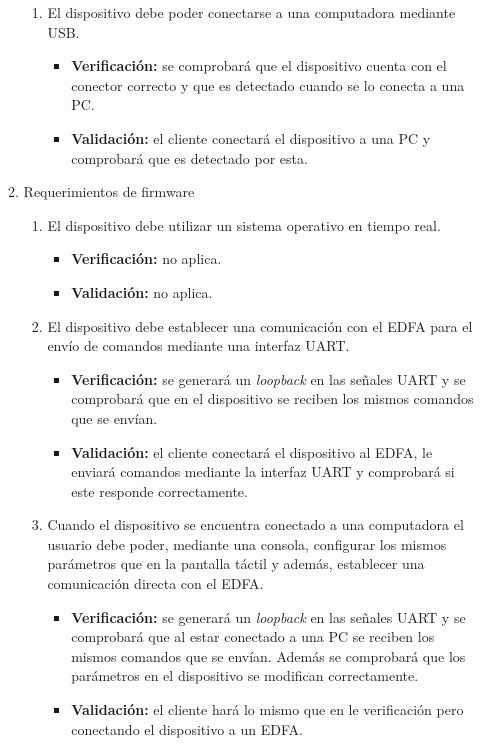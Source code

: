 \documentclass[
11pt, %
]{charter}
\begin{document}
\begin{enumerate}
\begin{enumerate}
\begin{enumerate}[label*=\arabic*.]
\item El dispositivo debe poder conectarse a una computadora mediante USB.
\begin{itemize}
	\item \textbf{Verificación:} se comprobará que el dispositivo cuenta con el conector correcto y que es detectado cuando se lo conecta a una PC.
	\item \textbf{Validación:} el cliente conectará el dispositivo a una PC y comprobará que es detectado por esta.
\end{itemize}

\end{enumerate}

\item Requerimientos de firmware
\begin{enumerate}[label*=\arabic*.]
\item El dispositivo debe utilizar un sistema operativo en tiempo real.
\begin{itemize}
	\item \textbf{Verificación:} no aplica.
	\item \textbf{Validación:} no aplica.
\end{itemize}

\item El dispositivo debe establecer una comunicación con el EDFA para el envío de comandos mediante una interfaz UART.
\begin{itemize}
	\item \textbf{Verificación:} se generará un \textit{loopback} en las señales UART y se comprobará que en el dispositivo se reciben los mismos comandos que se envían.
	\item \textbf{Validación:} el cliente conectará el dispositivo al EDFA, le enviará comandos mediante la interfaz UART y comprobará si este responde correctamente.
\end{itemize}

\item Cuando el dispositivo se encuentra conectado a una computadora el usuario debe poder, mediante una consola, configurar los mismos parámetros que en la pantalla táctil y además, establecer una comunicación directa con el EDFA.
\begin{itemize}
	\item \textbf{Verificación:} se generará un \textit{loopback} en las señales UART y se comprobará que al estar conectado a una PC se reciben los mismos comandos que se envían. Además se comprobará que los parámetros en el dispositivo se modifican correctamente.
	\item \textbf{Validación:} el cliente hará lo mismo que en le verificación pero conectando el dispositivo a un EDFA.
\end{itemize}


\end{enumerate}
\end{enumerate}
\end{enumerate}
\end{document}
